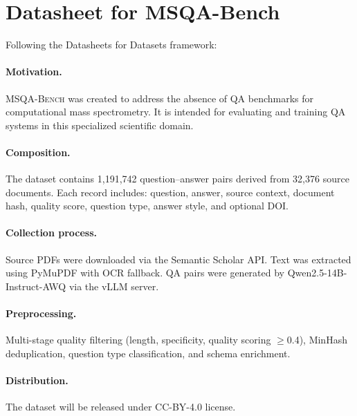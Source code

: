 \documentclass[11pt]{article}
\newcommand{\msqa}{\textsc{MSQA-Bench}}
\begin{document}




\appendix

\section{Datasheet for MSQA-Bench}
\label{app:datasheet}

Following the Datasheets for Datasets framework:

\paragraph{Motivation.}
\msqa{} was created to address the absence of QA benchmarks for computational
mass spectrometry. It is intended for evaluating and training QA systems in
this specialized scientific domain.

\paragraph{Composition.}
The dataset contains 1,191,742 question--answer pairs derived from 32,376
source documents. Each record includes: question, answer, source context,
document hash, quality score, question type, answer style, and optional DOI.

\paragraph{Collection process.}
Source PDFs were downloaded via the Semantic Scholar API. Text was extracted
using PyMuPDF with OCR fallback. QA pairs were generated by
Qwen2.5-14B-Instruct-AWQ via the vLLM server.

\paragraph{Preprocessing.}
Multi-stage quality filtering (length, specificity, quality scoring $\geq$0.4),
MinHash deduplication, question type classification, and schema enrichment.

\paragraph{Distribution.}
The dataset will be released under CC-BY-4.0 license.
\end{document}
